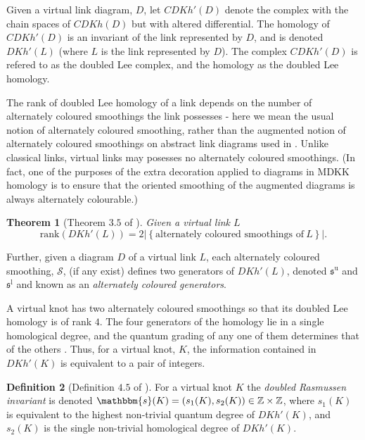 \documentclass[10pt,oneside]{amsart}
\newtheorem{theorem}{Theorem}[section]
\theoremstyle{definition}
\newtheorem{definition}[theorem]{Definition}
\numberwithin{equation}{section}
\begin{document}
Given a virtual link diagram, \( D \), let \( {CDKh} ' ( D ) \) denote the complex with the chain spaces of \( {CDKh} ( D ) \) but with altered differential. The homology of \( {CDKh} ' ( D ) \) is an invariant of the link represented by \( D \), and is denoted \( {DKh} ' ( L ) \) (where \( L \) is the link represented by \( D \)). The complex \( {CDKh} ' ( D ) \) is refered to as the doubled Lee complex, and the homology as the doubled Lee homology.

The rank of doubled Lee homology of a link depends on the number of alternately coloured smoothings the link possesses - here we mean the usual notion of alternately coloured smoothing, rather than the augmented notion of alternately coloured smoothings on abstract link diagrams used in . Unlike classical links, virtual links may posesses no alternately coloured smoothings. (In fact, one of the purposes of the extra decoration applied to diagrams in MDKK homology is to ensure that the oriented smoothing of the augmented diagrams is always alternately colourable.)

\begin{theorem}[Theorem \(3.5\) of \cite{Rushworth2017}]
	\label{Thm:leerank}
	Given a virtual link \( L \)
	\begin{equation*}
	\text{rank} \left( {DKh}' ( L ) \right) = 2 \left| \left\{ \text{alternately coloured smoothings of}~ L \right\} \right |.
	\end{equation*}
\end{theorem}

Further, given a diagram \( D \) of a virtual link \( L \), each alternately coloured smoothing, \( \mathscr{S} \), (if any exist) defines two generators of \( {DKh} ' ( L ) \), denoted \( {\mathfrak{s}}^\text{u} \) and \( {\mathfrak{s}}^\text{l} \) and known as an \emph{alternately coloured generators}.

A virtual knot has two alternately coloured smoothings \cite[Theorem \(3.12\)]{Rushworth2017} so that its doubled Lee homology is of rank \( 4 \). The four generators of the homology lie in a single homological degree, and the quantum grading of any one of them determines that of the others \cite[Lemma \(4.2\)]{Rushworth2017}. Thus, for a virtual knot, \( K \), the information contained in \( {DKh} ' ( K ) \) is equivalent to a pair of integers.

\begin{definition}[Definition \( 4.5 \) of \cite{Rushworth2017}]
	For a virtual knot \( K \) the \emph{doubled Rasmussen invariant} is denoted \( \mathbbm{s} ( K ) = ( s_1 ( K ), s_2 ( K ) ) \in \mathbb{Z} \times \mathbb{Z} \), where \( s_1 ( K ) \) is equivalent to the highest non-trivial quantum degree of \( {DKh} ' ( K ) \), and \( s_2 ( K ) \) is the single non-trivial homological degree of \( {DKh} ' ( K ) \).
\end{definition}
\end{document}
